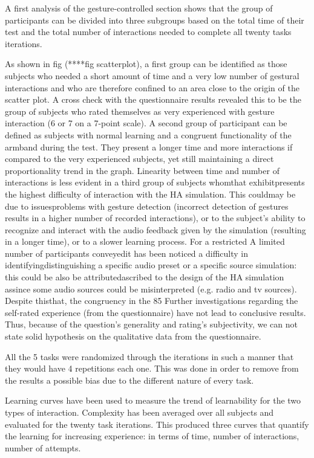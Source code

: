 \documentclass[journal]{./IEEEtran}
\begin{document}
A first analysis of the gesture-controlled section shows that the group of participants can be divided into three subgroups based on the total time of their test and the total number of interactions needed to complete all twenty tasks iterations. 

As shown in fig (****fig scatterplot), a first group can be identified as those subjects  who needed a short amount of time and a very low number of gestural interactions and who are therefore confined to an area close to the origin of the scatter plot. A cross check with the questionnaire results revealed this to be the group of subjects who rated themselves as very experienced with gesture interaction (6 or 7 on a 7-point scale).
A second group of participant can be defined as subjects with normal learning and a congruent functionality of the armband during the test. They present a longer time and more interactions if compared to the very experienced subjects, yet still maintaining a direct proportionality trend in the graph. Linearity between time and number of interactions is less evident in a third group of subjects whomthat exhibitpresents the highest difficulty of interaction with the HA simulation. This couldmay be due to issuesproblems with gesture detection (incorrect detection of gestures results in a higher number of recorded interactions), or to the subject’s ability to recognize and interact with the audio feedback given by the simulation (resulting in a longer time), or to a slower learning process. For a restricted A limited number of participants conveyedit has been noticed a difficulty in identifyingdistinguishing a specific audio preset or a specific source simulation: this could be also be attributedascribed to the design of the HA simulation assince some audio sources could be misinterpreted (e.g. radio and tv sources). Despite thisthat, the congruency in the 85%
Further investigations regarding the self-rated experience (from the questionnaire) have not lead to conclusive results. Thus, because of the question’s generality and rating’s subjectivity, we can not state solid hypothesis on the qualitative data from the questionnaire.

All the 5 tasks were randomized through the iterations in such a manner that they would have 4 repetitions each one. This was done in order to remove from the results a possible bias due to the different nature of every task.

Learning curves have been used to measure the trend of learnability for the two types of interaction. Complexity has been averaged over all subjects and evaluated for the twenty task iterations. This produced three curves that quantify the learning for increasing experience: in terms of time, number of interactions, number of attempts.
\end{document}
